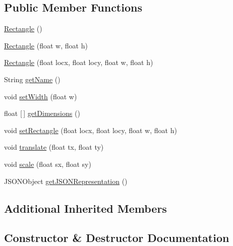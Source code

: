 \subsection*{Public Member Functions}
\begin{DoxyCompactItemize}
\item 
\mbox{\hyperlink{classbridges_1_1base_1_1_rectangle_a6d80c63a14e9b94df552dac422348dc3}{Rectangle}} ()
\item 
\mbox{\hyperlink{classbridges_1_1base_1_1_rectangle_ae23e33dbe811d3f49b542b02d1800952}{Rectangle}} (float w, float h)
\item 
\mbox{\hyperlink{classbridges_1_1base_1_1_rectangle_a4df21db188c66f5635191f306a29c7e3}{Rectangle}} (float locx, float locy, float w, float h)
\item 
String \mbox{\hyperlink{classbridges_1_1base_1_1_rectangle_ab785b45f264ae3cd61a5a898ffa6afba}{get\+Name}} ()
\item 
void \mbox{\hyperlink{classbridges_1_1base_1_1_rectangle_a1c42d0e5fc64adc1c2a696c88dd6f82e}{set\+Width}} (float w)
\item 
float \mbox{[}$\,$\mbox{]} \mbox{\hyperlink{classbridges_1_1base_1_1_rectangle_a3d667a1ff6d7d49ba2d8560c939b3f88}{get\+Dimensions}} ()
\item 
void \mbox{\hyperlink{classbridges_1_1base_1_1_rectangle_a267eafb8107ea074598fbf4d2d3dc72d}{set\+Rectangle}} (float locx, float locy, float w, float h)
\item 
void \mbox{\hyperlink{classbridges_1_1base_1_1_rectangle_a4fed6a85f136c7946ea4e79f2553cffe}{translate}} (float tx, float ty)
\item 
void \mbox{\hyperlink{classbridges_1_1base_1_1_rectangle_ad2612f09cf16cd829efd13007df53f7f}{scale}} (float sx, float sy)
\item 
J\+S\+O\+N\+Object \mbox{\hyperlink{classbridges_1_1base_1_1_rectangle_ad9a44cbdc301594b8708769461ad4461}{get\+J\+S\+O\+N\+Representation}} ()
\end{DoxyCompactItemize}
\subsection*{Additional Inherited Members}


\subsection{Constructor \& Destructor Documentation}
\mbox{\label{classbridges_1_1base_1_1_rectangle_a6d80c63a14e9b94df552dac422348dc3}} 
